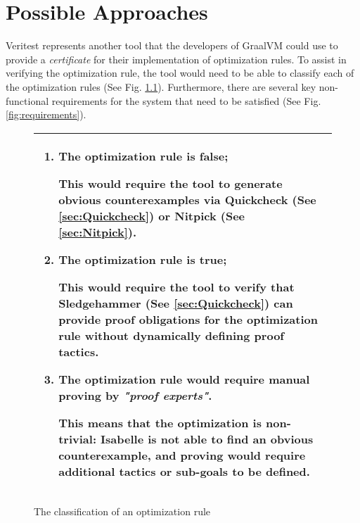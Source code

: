 \chapter{Possible Approaches \label{sec:PossibleApproaches}}

Veritest represents another tool that the developers of GraalVM could use to provide a \emph{certificate} for their implementation of optimization rules. 
To assist in verifying the optimization rule, the tool would need to be able to classify each of the optimization rules 
(See Fig. \ref{fig:classification}). Furthermore, there are several key non-functional requirements for the system that need to be satisfied 
(See Fig. \ref{fig:requirements}).

\begin{figure}[h]
      \begin{tabular}{|L{0.95\textwidth}|}
            \hline
            \begin{enumerate}
                  \item The optimization rule is false;
                  
                        This would require the tool to generate obvious counterexamples via Quickcheck (See \ref{sec:Quickcheck}) or Nitpick 
                        (See \ref{sec:Nitpick}).
              
                  \item The optimization rule is true;
                  
                        This would require the tool to verify that Sledgehammer (See \ref{sec:Quickcheck}) can provide proof obligations for the 
                        optimization rule \textbf{without} dynamically defining proof tactics.
              
                  \item The optimization rule would require manual proving by \emph{"proof experts"}.
                        
                        This means that the optimization is non-trivial: Isabelle is not able to find an obvious counterexample, and proving would require 
                        additional tactics or sub-goals to be defined.
            \end{enumerate} \\
            \hline
      \end{tabular}
      \caption{The classification of an optimization rule}
      \label{fig:classification}
\end{figure}

